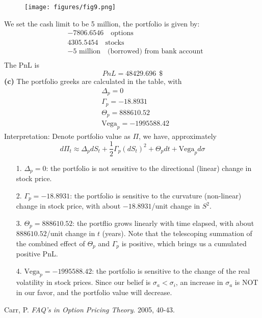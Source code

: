 \documentclass[10 pt]{hwtemplate} %
\begin{document}
\begin{solution}
\begin{figure}[H]
  \texttt{[image: figures/fig9.png]}
\end{figure}
We set the cash limit to be 5 million, the portfolio is given by:
\begin{equation}
  \begin{split}
    &-7806.6546 \text{ ~~options} \\
    &4305.5454 \text{ ~~stocks} \\
    &-5 \text{~million ~~(borrowed) from bank account} \\
  \end{split}
\end{equation}
The PnL is
\begin{equation}
  PnL = 48429.696~~\$
\end{equation}
\textbf{(c)} The portfolio greeks are calculated in the table, with
\begin{equation}
  \begin{split}
    & \Delta_p = 0\\
    & \Gamma_p = -18.8931\\
    & \Theta_p = 888610.52\\
    & \text{Vega}_p = -1995588.42
  \end{split}
\end{equation}
Interpretation: Denote portfolio value as $\Pi$, we have, approximately
\begin{equation}
  d\Pi_t \approx \Delta_p dS_t + \frac{1}{2}\Gamma_p (dS_t)^2 + \Theta_p dt + \text{Vega}_p d\sigma
\end{equation}
\begin{itemize}
  \item[1.] $\Delta_p=0$: the portfolio is not sensitive to the directional (linear) change in stock price.
  \item[2.] $\Gamma_p=-18.8931$: the portfolio is sensitive to the curvature (non-linear) change in stock price, with about $-18.8931$/unit change in $S^2$.
  \item[3.] $\Theta_p = 888610.52$: the portflio grows linearly with time elapsed, with about $888610.52$/unit change in $t$ (years). Note that the telescoping summation of the combined effect of $\Theta_p$ and $\Gamma_p$ is positive, which brings us a cumulated positive PnL.
  \item[4.] $\text{Vega}_p = -1995588.42$: the portfolio is sensitive to the change of the real volatility in stock prices. Since our belief is $\sigma_a<\sigma_i$, an increase in $\sigma_a$ is NOT in our favor, and the portfolio value will decrease.
\end{itemize}
\end{solution}

\begin{thebibliography}{}
Carr, P.
\textit{FAQ's in Option Pricing Theory}. 2005, 40-43. 
\end{thebibliography}
\end{document}
